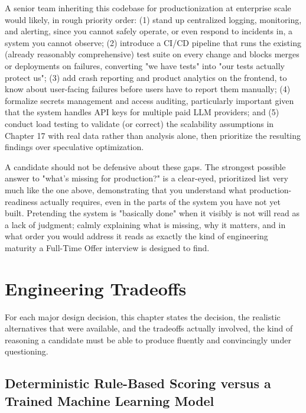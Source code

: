\documentclass[11pt,a4paper]{report}
\begin{document}
A senior team inheriting this codebase for productionization at enterprise scale would likely, in rough priority order: (1) stand up centralized logging, monitoring, and alerting, since you cannot safely operate, or even respond to incidents in, a system you cannot observe; (2) introduce a CI/CD pipeline that runs the existing (already reasonably comprehensive) test suite on every change and blocks merges or deployments on failures, converting "we have tests" into "our tests actually protect us"; (3) add crash reporting and product analytics on the frontend, to know about user-facing failures before users have to report them manually; (4) formalize secrets management and access auditing, particularly important given that the system handles API keys for multiple paid LLM providers; and (5) conduct load testing to validate (or correct) the scalability assumptions in Chapter 17 with real data rather than analysis alone, then prioritize the resulting findings over speculative optimization.

\begin{notebox}
A candidate should not be defensive about these gaps. The strongest possible answer to "what's missing for production?" is a clear-eyed, prioritized list very much like the one above, demonstrating that you understand what production-readiness actually requires, even in the parts of the system you have not yet built. Pretending the system is "basically done" when it visibly is not will read as a lack of judgment; calmly explaining what is missing, why it matters, and in what order you would address it reads as exactly the kind of engineering maturity a Full-Time Offer interview is designed to find.
\end{notebox}

\chapter{Engineering Tradeoffs}

For each major design decision, this chapter states the decision, the realistic alternatives that were available, and the tradeoffs actually involved, the kind of reasoning a candidate must be able to produce fluently and convincingly under questioning.

\section{Deterministic Rule-Based Scoring versus a Trained Machine Learning Model}
\end{document}
